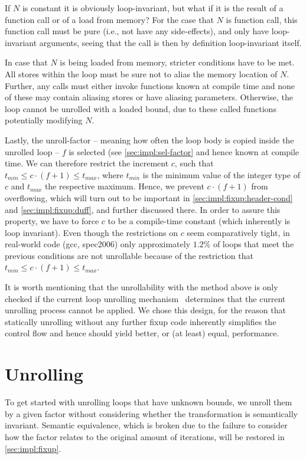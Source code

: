 If $N$ is constant it is obviously loop-invariant, but what if it is the result of a function call or of a load from memory?
For the case that $N$ is function call, this function call must be pure (i.e., not have any side-effects), and only have loop-invariant arguments, seeing that the call is then by definition loop-invariant itself.

In case that $N$ is being loaded from memory, stricter conditions have to be met.
All stores within the loop must be sure not to alias the memory location of $N$.
Further, any calls must either invoke functions known at compile time and none of these may contain aliasing stores or have aliasing parameters.
Otherwise, the loop cannot be unrolled with a loaded bound, due to these called functions potentially modifying $N$.

Lastly, the unroll-factor -- meaning how often the loop body is copied inside the unrolled loop -- $f$ is selected (see \cref{sec:impl:sel-factor} and hence known at compile time.
We can therefore restrict the increment $c$, such that $t_{min} \leq c \cdot (f+1) \leq t_{max}$, where $t_{min}$ is the minimum value of the integer type of $c$ and $t_{max}$ the respective maximum.
Hence, we prevent $c \cdot (f + 1)$ from overflowing, which will turn out to be important in \cref{sec:impl:fixup:header-cond} and \cref{sec:impl:fixup:duff}, and further discussed there.
In order to assure this property, we have to force $c$ to be a compile-time constant (which inherently is loop invariant).
Even though the restrictions on $c$ seem comparatively tight, in real-world code (gcc, spec2006) only approximately $1.2\%$ of loops that meet the previous conditions are not unrollable because of the restriction that  $t_{min} \leq c \cdot (f+1) \leq t_{max}$.

It is worth mentioning that the unrollability with the method above is only checked if the current loop unrolling mechanism~\cite{aebi18bachelorarbeit} determines that the current unrolling process cannot be applied.
We chose this design, for the reason that statically unrolling without any further fixup code inherently simplifies the control flow and hence should yield better, or (at least) equal, performance.

\section{Unrolling}\label{sec:impl:unroll}

To get started with unrolling loops that have unknown bounds, we unroll them by a given factor without considering whether the transformation is semantically invariant.
Semantic equivalence, which is broken due to the failure to consider how the factor relates to the original amount of iterations, will be restored in \cref{sec:impl:fixup}.


